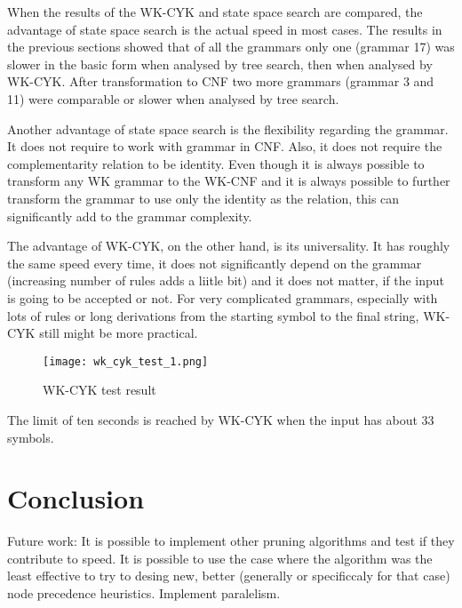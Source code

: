 When the results of the WK-CYK and state space search are compared, the advantage of state space search is the actual speed in most cases. The results in the previous sections showed that of all the grammars only one (grammar 17) was slower in the basic form when analysed by tree search, then when analysed by WK-CYK. After transformation to CNF two more grammars (grammar 3 and 11) were comparable or slower when analysed by tree search.

Another advantage of state space search is the flexibility regarding the grammar. It does not require to work with grammar in CNF. Also, it does not require the complementarity relation to be identity. Even though it is always possible to transform any WK grammar to the WK-CNF and it is always possible to further transform the grammar to use only the identity as the relation, this can significantly add to the grammar complexity.

The advantage of WK-CYK, on the other hand, is its universality. It has roughly the same speed every time, it does not significantly depend on the grammar (increasing number of rules adds a liitle bit) and it does not matter, if the input is going to be accepted or not. For very complicated grammars, especially with lots of rules or long derivations from the starting symbol to the final string, WK-CYK still might be more practical.

\begin{figure}[h]
  \centering
  \texttt{[image: wk\_cyk\_test\_1.png]}
  \caption{WK-CYK test result}
  \label{fig:wk_cyk_test1}
\end{figure}

The limit of ten seconds is reached by WK-CYK when the input has about 33 symbols.

\chapter{Conclusion}
Future work: It is possible to implement other pruning algorithms and test if they contribute to speed. It is possible to use the case where the algorithm was the least effective to try to desing new, better (generally or specificcaly for that case) node precedence heuristics.
Implement paralelism.
